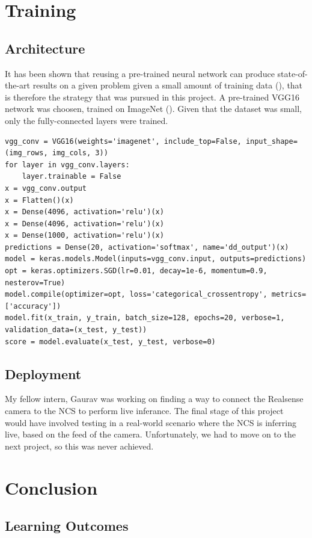 \section{Training}
    \subsection{Architecture}
    It has been shown that reusing a pre-trained neural network can produce state-of-the-art results on a given problem given a small amount of training data (\cite{Razavian_2014_CVPR_Workshops}), that is therefore the strategy that was pursued in this project. A pre-trained VGG16 network was choosen, trained on ImageNet (\cite{imagenet_cvpr09}). Given that the dataset was small, only the fully-connected layers were trained.
    \begin{lstlisting}[style=PythonStyle]
vgg_conv = VGG16(weights='imagenet', include_top=False, input_shape=(img_rows, img_cols, 3))
for layer in vgg_conv.layers:
    layer.trainable = False
x = vgg_conv.output
x = Flatten()(x)
x = Dense(4096, activation='relu')(x)
x = Dense(4096, activation='relu')(x)
x = Dense(1000, activation='relu')(x)
predictions = Dense(20, activation='softmax', name='dd_output')(x)
model = keras.models.Model(inputs=vgg_conv.input, outputs=predictions)
opt = keras.optimizers.SGD(lr=0.01, decay=1e-6, momentum=0.9, nesterov=True)
model.compile(optimizer=opt, loss='categorical_crossentropy', metrics=['accuracy'])
model.fit(x_train, y_train, batch_size=128, epochs=20, verbose=1, validation_data=(x_test, y_test))
score = model.evaluate(x_test, y_test, verbose=0)\end{lstlisting}

    \subsection{Deployment}
    My fellow intern, Gaurav was working on finding a way to connect the Realsense camera to the NCS to perform live inferance. The final stage of this project would have involved testing in a real-world scenario where the NCS is inferring live, based on the feed of the camera. Unfortunately, we had to move on to the next project, so this was never achieved.

\section{Conclusion}
    \subsection{Learning Outcomes}
